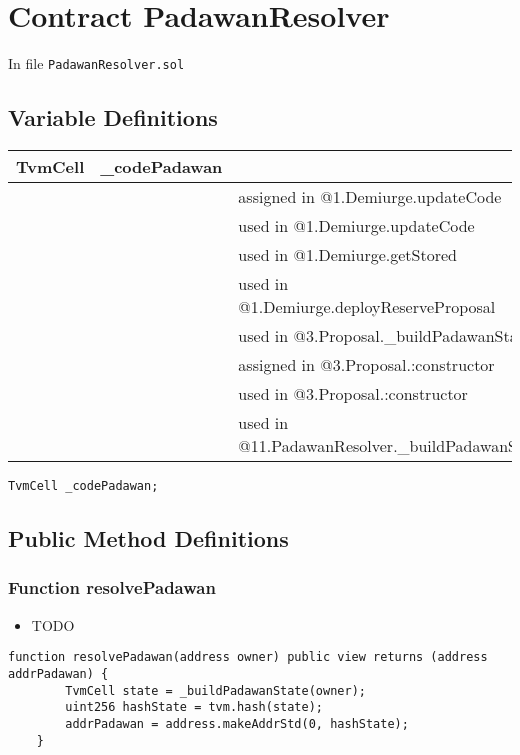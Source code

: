 
\chapter{Contract PadawanResolver}

\minitoc

In file {\tt PadawanResolver.sol}

\section{Variable Definitions}


\ifsoltables
\noindent\begin{tabular}{|l|l|p{5cm}|}\hline
TvmCell & \_{}codePadawan &  \\\hline
 & & assigned in @1.Demiurge.updateCode\\\hline
 & & used in @1.Demiurge.updateCode\\\hline
 & & used in @1.Demiurge.getStored\\\hline
 & & used in @1.Demiurge.deployReserveProposal\\\hline
 & & used in @3.Proposal.\_{}buildPadawanState\\\hline
 & & assigned in @3.Proposal.:constructor\\\hline
 & & used in @3.Proposal.:constructor\\\hline
 & & used in @11.PadawanResolver.\_{}buildPadawanState\\\hline
\end{tabular}
\fi


\begin{lstlisting}[firstnumber=8]
    TvmCell _codePadawan;
\end{lstlisting}

\section{Public Method Definitions}


\subsection{Function resolvePadawan}

\begin{itemize}
\item TODO
\end{itemize}

\begin{lstlisting}[firstnumber=10]
    function resolvePadawan(address owner) public view returns (address addrPadawan) {
        TvmCell state = _buildPadawanState(owner);
        uint256 hashState = tvm.hash(state);
        addrPadawan = address.makeAddrStd(0, hashState);
    }
\end{lstlisting}

